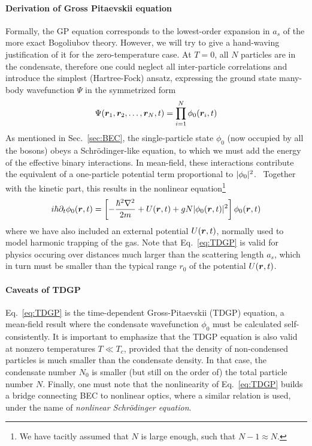 \paragraph{Derivation of Gross Pitaevskii equation}
Formally, the GP equation corresponds to the lowest-order expansion in
$a_s$ of the more exact Bogoliubov theory. However, we will try to
give a hand-waving justification of it for the zero-temperature
case. At $T=0$, all $N$ particles are in the condensate, therefore one
could neglect all inter-particle correlations and introduce the
simplest (Hartree-Fock) ansatz, expressing the ground state many-body
wavefunction $\Psi$ in the symmetrized form
%
\begin{equation}\label{eq:HF-ansatz}
  \Psi(\bm{r}_1,\bm{r}_2,\dots,\bm{r}_N,t) = \prod_{i = 1}^{N} \phi_0(\bm{r}_i,t)
\end{equation}
% 
As mentioned in Sec.~\ref{sec:BEC}, the single-particle state $\phi_0$
(now occupied by all the bosons) obeys a Schr\"{o}dinger-like
equation, to which we must add the energy of the effective binary
interactions. In mean-field, these interactions contribute the
equivalent of a one-particle potential term proportional to
$\vert \phi_0 \vert^2$.~\cite{Leggett_1999} Together with the kinetic part,
this results in the nonlinear equation\footnote{We have tacitly
  assumed that $N$ is large enough, such that $N-1 \approx N$.}
%
\begin{equation}\label{eq:TDGP}
  i\hbar\partial_t\phi_0(\bm{r},t) = 
  \left[-\frac{\hbar^2\nabla^2}{2m} + U(\bm{r},t) + g N |\phi_0(\bm{r},t)|^2\right]\phi_0(\bm{r},t)
\end{equation}
% 
where we have also included an external potential $U(\bm{r},t)$, normally
used to model harmonic trapping of the gas. Note that
Eq.~\eqref{eq:TDGP} is valid for physics occuring over distances much
larger than the scattering length $a_s$, which in turn must be smaller
than the typical range $r_0$ of the potential $U(\bm{r},t)$.

\paragraph{Caveats of TDGP}
Eq.~\eqref{eq:TDGP} is the time-dependent Gross-Pitaevskii (TDGP)
equation, a mean-field result where the condensate wavefunction
$\phi_0$ must be calculated self-consistently. It is important to
emphasize that the TDGP equation is also valid at nonzero temperatures
$T \ll T_c$, provided that the density of non-condensed particles is
much smaller than the condensate density. In that case, the condensate
number $N_0$ is smaller (but still on the order of) the total particle
number $N$. Finally, one must note that the nonlinearity of
Eq.~\eqref{eq:TDGP} builds a bridge connecting BEC to nonlinear
optics, where a similar relation is used, under the name of
\textit{nonlinear Schr\"{o}dinger equation}.

